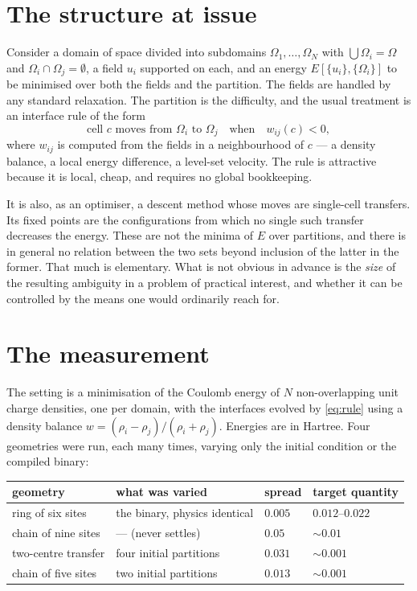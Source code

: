 \documentclass[11pt]{article}
\begin{document}
\section{The structure at issue}

Consider a domain of space divided into subdomains $\Omega_1,\dots,\Omega_N$ with
$\bigcup\Omega_i=\Omega$ and $\Omega_i\cap\Omega_j=\emptyset$, a field $u_i$ supported on each, and
an energy $E[\{u_i\},\{\Omega_i\}]$ to be minimised over both the fields and the partition. The
fields are handled by any standard relaxation. The partition is the difficulty, and the usual
treatment is an interface rule of the form
\begin{equation}\label{eq:rule}
\text{cell } c \text{ moves from } \Omega_i \text{ to } \Omega_j
\quad\text{when}\quad w_{ij}(c) < 0 ,
\end{equation}
where $w_{ij}$ is computed from the fields in a neighbourhood of $c$ --- a density balance, a local
energy difference, a level-set velocity. The rule is attractive because it is local, cheap, and
requires no global bookkeeping.

It is also, as an optimiser, a descent method whose moves are single-cell transfers. Its fixed
points are the configurations from which no single such transfer decreases the energy. These are
not the minima of $E$ over partitions, and there is in general no relation between the two sets
beyond inclusion of the latter in the former. That much is elementary. What is not obvious in
advance is the \emph{size} of the resulting ambiguity in a problem of practical interest, and
whether it can be controlled by the means one would ordinarily reach for.

\section{The measurement}

The setting is a minimisation of the Coulomb energy of $N$ non-overlapping unit charge densities,
one per domain, with the interfaces evolved by \eqref{eq:rule} using a density balance
$w=(\rho_i-\rho_j)/(\rho_i+\rho_j)$. Energies are in Hartree. Four geometries were run, each many
times, varying only the initial condition or the compiled binary:

\begin{center}
\small
\begin{tabular}{@{}llll@{}}
\toprule
geometry & what was varied & spread & target quantity\\
\midrule
ring of six sites      & the binary, physics identical & $0.005$ & $0.012$--$0.022$\\
chain of nine sites    & --- (never settles)           & $0.05$  & $\sim0.01$\\
two-centre transfer    & four initial partitions       & $0.031$ & $\sim0.001$\\
chain of five sites    & two initial partitions        & $0.013$ & $\sim0.001$\\
\bottomrule
\end{tabular}
\end{center}
\end{document}
